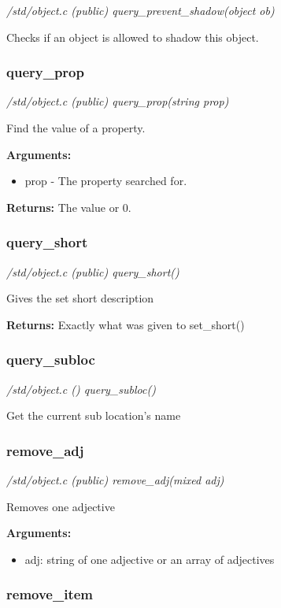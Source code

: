 {\em /std/object.c (public) query\_prevent\_shadow(object ob)}

Checks if an object is allowed to shadow this object.


\subsubsection{query\_prop}

{\em /std/object.c (public) query\_prop(string prop)}

Find the value of a property.

{\bf Arguments:}
\begin{itemize}
\item     prop - The property searched for.
\end{itemize}

{\bf Returns:}        The value or 0.


\subsubsection{query\_short}

{\em /std/object.c (public) query\_short()}

Gives the set short description

{\bf Returns:}        Exactly what was given to set\_short()


\subsubsection{query\_subloc}

{\em /std/object.c () query\_subloc()}

Get the current sub location's name


\subsubsection{remove\_adj}

{\em /std/object.c (public) remove\_adj(mixed adj)}

Removes one adjective

{\bf Arguments:}
\begin{itemize}
\item     adj: string of one adjective or an array of adjectives
\end{itemize}


\subsubsection{remove\_item}

